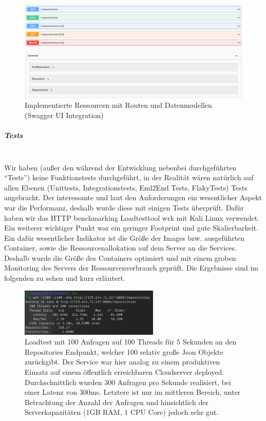 \documentclass[notitlepage, hidelinks]{article}
\begin{document}
\begin{figure}[H]
\centering
  \includegraphics[width=\textwidth]{images/swagger.png}
  \caption{Implementierte Ressourcen mit Routen und Datenmodellen (Swagger UI Integration)}
  \label{fig:apione}
\end{figure}


\subparagraph{Tests}  \mbox{} \\
Wir haben (außer den während der Entwicklung nebenbei durchgeführten ``Tests'') keine Funktionstests durchgeführt, in der Realität wären natürlich auf allen Ebenen (Unittests, Integrationstests, End2End Tests, FlakyTests) Tests angebracht. Der interessante und laut den Anforderungen ein wesentlicher Aspekt war die Performanz, deshalb wurde diese mit einigen Tests überprüft. Dafür haben wir das HTTP benchmarking Loadtesttool wrk mit Kali Linux verwendet. \\
Ein weiterer wichtiger Punkt war ein geringer Footprint und gute Skalierbarkeit. Ein dafür wesentlicher Indikator ist die Größe der Images bzw. ausgeführten Container, sowie die Ressourcenallokation auf dem Server an die Services. Deshalb wurde die Größe des Containers optimiert und mit einem groben Monitoring des Servers der Ressourcenverbrauch geprüft. Die Ergebnisse sind im folgenden zu sehen und kurz erläutert.

\begin{figure}[H]
\centering
  \includegraphics[width=250px]{images/data.png}
  \caption{Loadtest mit 100 Anfragen auf 100 Threads für 5 Sekunden an den Repositories Endpunkt, welcher 100 relativ große Json Objekte zurückgibt. Der Service war hier analog zu einem produktiven Einsatz auf einem öffentlich erreichbaren Cloudserver deployed. Durchschnittlich wurden 300 Anfragen pro Sekunde realisiert, bei einer Latenz von 300ms. Letztere ist nur im mittleren Bereich, unter Betrachtung der Anzahl der Anfragen und hinsichtlich der Serverkapazitäten (1GB RAM, 1 CPU Core) jedoch sehr gut.}
  \label{fig:benchmarkthree}
\end{figure}
\end{document}
